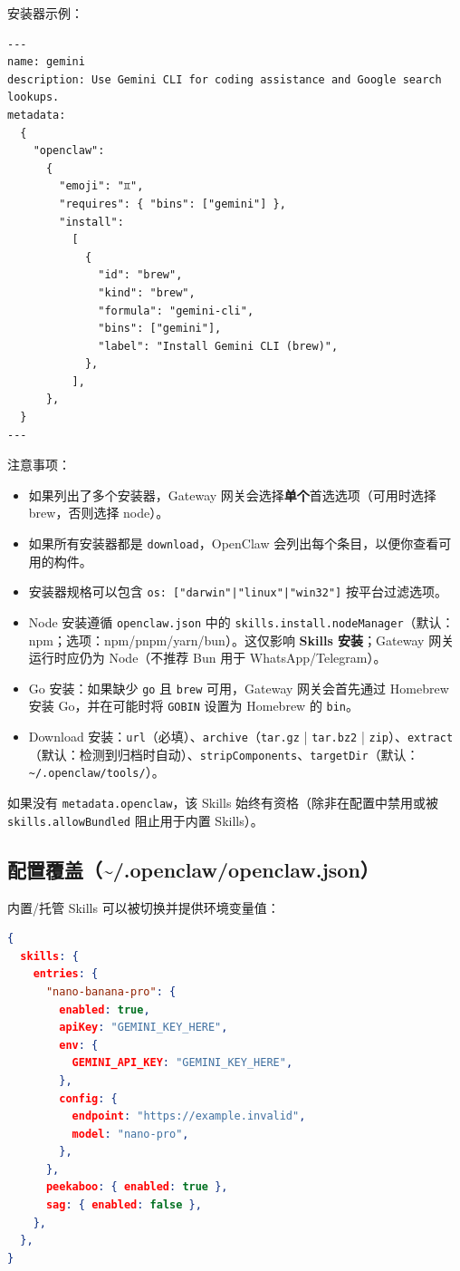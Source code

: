 安装器示例：

\begin{lstlisting}
---
name: gemini
description: Use Gemini CLI for coding assistance and Google search lookups.
metadata:
  {
    "openclaw":
      {
        "emoji": "♊",
        "requires": { "bins": ["gemini"] },
        "install":
          [
            {
              "id": "brew",
              "kind": "brew",
              "formula": "gemini-cli",
              "bins": ["gemini"],
              "label": "Install Gemini CLI (brew)",
            },
          ],
      },
  }
---
\end{lstlisting}


注意事项：

\begin{itemize}
  \item 如果列出了多个安装器，Gateway 网关会选择\textbf{单个}首选选项（可用时选择 brew，否则选择 node）。
  \item 如果所有安装器都是 \texttt{download}，OpenClaw 会列出每个条目，以便你查看可用的构件。
  \item 安装器规格可以包含 \texttt{os: ["darwin"|"linux"|"win32"]} 按平台过滤选项。
  \item Node 安装遵循 \texttt{openclaw.json} 中的 \texttt{skills.install.nodeManager}（默认：npm；选项：npm/pnpm/yarn/bun）。这仅影响 \textbf{Skills 安装}；Gateway 网关运行时应仍为 Node（不推荐 Bun 用于 WhatsApp/Telegram）。
  \item Go 安装：如果缺少 \texttt{go} 且 \texttt{brew} 可用，Gateway 网关会首先通过 Homebrew 安装 Go，并在可能时将 \texttt{GOBIN} 设置为 Homebrew 的 \texttt{bin}。
  \item Download 安装：\texttt{url}（必填）、\texttt{archive}（\texttt{tar.gz} | \texttt{tar.bz2} | \texttt{zip}）、\texttt{extract}（默认：检测到归档时自动）、\texttt{stripComponents}、\texttt{targetDir}（默认：\texttt{\textasciitilde{}/.openclaw/tools/}）。
\end{itemize}


如果没有 \texttt{metadata.openclaw}，该 Skills 始终有资格（除非在配置中禁用或被 \texttt{skills.allowBundled} 阻止用于内置 Skills）。

\subsection{配置覆盖（\textasciitilde{}/.openclaw/openclaw.json）}


内置/托管 Skills 可以被切换并提供环境变量值：

\begin{lstlisting}[language=json]
{
  skills: {
    entries: {
      "nano-banana-pro": {
        enabled: true,
        apiKey: "GEMINI_KEY_HERE",
        env: {
          GEMINI_API_KEY: "GEMINI_KEY_HERE",
        },
        config: {
          endpoint: "https://example.invalid",
          model: "nano-pro",
        },
      },
      peekaboo: { enabled: true },
      sag: { enabled: false },
    },
  },
}
\end{lstlisting}


